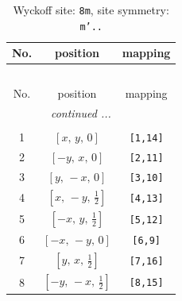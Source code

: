 \documentclass[fleqn,8pt]{jsarticle}
\begin{document}
\begin{longtable}{ccc}
\caption{Wyckoff site: {\tt 8m}, site symmetry: {\tt m'..}}
 \\
 \hline \hline
No. & position & mapping \\ \hline \endfirsthead

\multicolumn{2}{l}{\tablename\ \thetable{}} \\
 \hline \hline
No. & position & mapping \\ \hline \endhead

 \hline \hline
\multicolumn{2}{r}{\footnotesize\it continued ...} \\ \endfoot

 \hline \hline
\multicolumn{2}{r}{} \\ \endlastfoot

1 & $\left[ x,\, y,\, 0 \right]$ & {\tt [1,14]} \\ \hline
2 & $\left[ - y,\, x,\, 0 \right]$ & {\tt [2,11]} \\ \hline
3 & $\left[ y,\, - x,\, 0 \right]$ & {\tt [3,10]} \\ \hline
4 & $\left[ x,\, - y,\, \frac{1}{2} \right]$ & {\tt [4,13]} \\ \hline
5 & $\left[ - x,\, y,\, \frac{1}{2} \right]$ & {\tt [5,12]} \\ \hline
6 & $\left[ - x,\, - y,\, 0 \right]$ & {\tt [6,9]} \\ \hline
7 & $\left[ y,\, x,\, \frac{1}{2} \right]$ & {\tt [7,16]} \\ \hline
8 & $\left[ - y,\, - x,\, \frac{1}{2} \right]$ & {\tt [8,15]} \\
\end{longtable}
\renewcommand{\arraystretch}{1.2}
\end{document}
